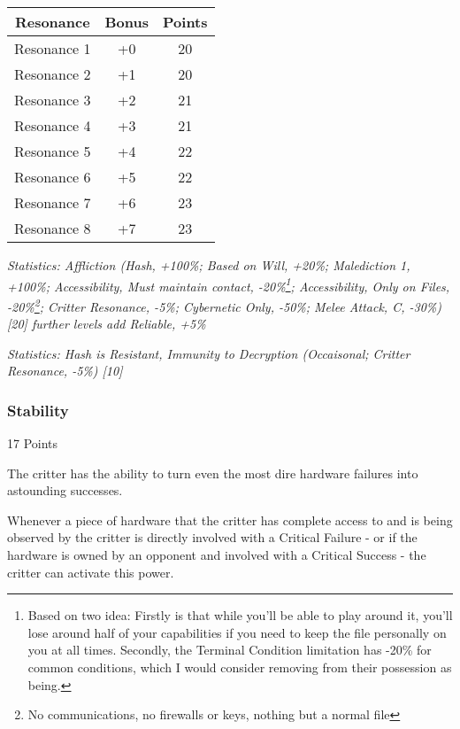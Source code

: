 \begin{multicols*}{3}
	\begin{center}
		\begin{tabular}{|c|c|c|}
			\hline
			Resonance & Bonus & Points \\
			\hline
			\hline
			Resonance 1 & +0 & 20 \\
			Resonance 2 & +1 & 20 \\
			Resonance 3 & +2 & 21 \\
			Resonance 4 & +3 & 21 \\
			Resonance 5 & +4 & 22 \\
			Resonance 6 & +5 & 22 \\
			Resonance 7 & +6 & 23 \\
			Resonance 8 & +7 & 23 \\
			\hline
		\end{tabular}
	\end{center}

	\textcolor{OliveGreen}{\textit{Statistics: Affliction (Hash, +100\%; Based on Will, +20\%; Malediction 1, +100\%; Accessibility, Must maintain contact, -20\%\footnote{Based on two idea: Firstly is that while you'll be able to play around it, you'll lose around half of your capabilities if you need to keep the file personally on you at all times. Secondly, the Terminal Condition limitation has -20\% for common conditions, which I would consider removing from their possession as being.}; Accessibility, Only on Files, -20\%\footnote{No communications, no firewalls or keys, nothing but a normal file}; Critter Resonance, -5\%; Cybernetic Only, -50\%; Melee Attack, C, -30\%) [20] further levels add Reliable, +5\%}}

	\textcolor{OliveGreen}{\textit{Statistics: Hash is Resistant, Immunity to Decryption (Occaisonal; Critter Resonance, -5\%) [10]}}

	\subsubsection{Stability}\label{stability}
	\begin{flushright}
		17 Points
	\end{flushright}

	The critter has the ability to turn even the most dire hardware failures into astounding successes.
	
	Whenever a piece of hardware that the critter has complete access to and is being observed by the critter is directly involved with a Critical Failure - or if the hardware is owned by an opponent and involved with a Critical Success - the critter can activate this power.
	

\end{multicols*}
